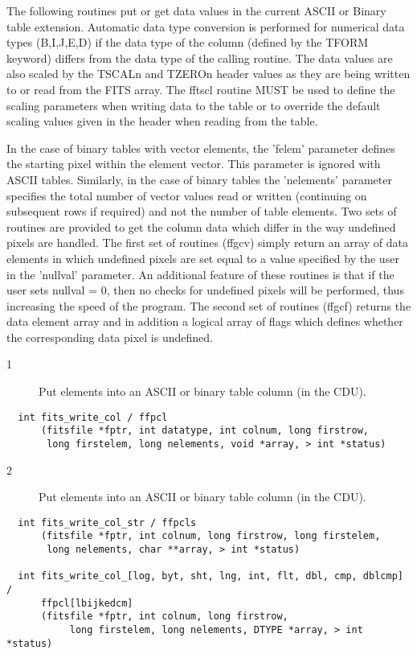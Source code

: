The following routines put or get data values in the current ASCII or
Binary table extension.  Automatic data type conversion is performed
for numerical data types (B,I,J,E,D) if the data type of the column
(defined by the TFORM keyword) differs from the data type of the
calling routine.  The data values are also scaled by the TSCALn and
TZEROn header values as they are being written to or read from the FITS
array.  The fftscl routine MUST be used to define the scaling
parameters when writing data to the table or to override the default
scaling values given in the header when reading from the table.

    In the case of binary tables with vector elements, the 'felem'
parameter defines the starting pixel within the element vector.  This
parameter is ignored with ASCII tables. Similarly, in the case of
binary tables the 'nelements' parameter specifies the total number of
vector values read or written (continuing on subsequent rows if
required) and not the number of table elements.  Two sets of
routines are provided to get the column data which differ in the way
undefined pixels are handled.  The first set of routines (ffgcv)
simply return an array of data elements in which undefined pixels are
set equal to a value specified by the user in the 'nullval' parameter.
An additional feature of these routines is that if the user sets
nullval = 0, then no checks for undefined pixels will be performed,
thus increasing the speed of the program.  The second set of routines
(ffgcf) returns the data element array and in addition a logical array
of flags which defines whether the corresponding data pixel is undefined.


\begin{description}
\item[1 ] Put elements into an ASCII or binary table column (in the CDU).
\end{description}

\begin{verbatim}
  int fits_write_col / ffpcl
      (fitsfile *fptr, int datatype, int colnum, long firstrow,
       long firstelem, long nelements, void *array, > int *status)
\end{verbatim}

\begin{description}
\item[2 ] Put elements into an ASCII or binary table column (in the CDU).
\end{description}

\begin{verbatim}
  int fits_write_col_str / ffpcls
      (fitsfile *fptr, int colnum, long firstrow, long firstelem,
       long nelements, char **array, > int *status)

  int fits_write_col_[log, byt, sht, lng, int, flt, dbl, cmp, dblcmp] /
      ffpcl[lbijkedcm]
      (fitsfile *fptr, int colnum, long firstrow,
           long firstelem, long nelements, DTYPE *array, > int *status)
\end{verbatim}

